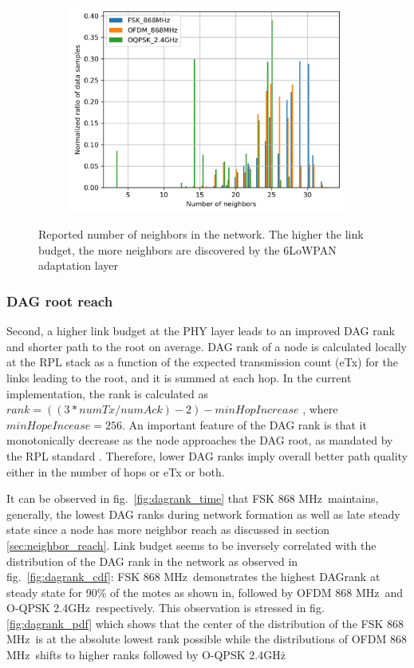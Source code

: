 \documentclass[journal]{IEEEtran}
\newcommand{\fsk}          {FSK 868 MHz}
\newcommand{\oqpsk}        {O-QPSK 2.4GHz}
\newcommand{\ofdm}         {OFDM 868 MHz}
\begin{document}
\begin{figure}[ht!]
    ~ 
	\begin{subfigure}{0.6\columnwidth}
		\centering
	\includegraphics[width=1\columnwidth]{numNeighbors_pdf_plot_full_steady_normalized}
	\label{fig:neighbors_pdf}
	\end{subfigure}%

	\caption{Reported number of neighbors in the network. The higher the link budget, the more neighbors are discovered by the 6LoWPAN adaptation layer} 
	\label{fig:neighbors_all}
\end{figure}

\subsubsection{DAG root reach}
Second, a higher link budget at the PHY layer leads to an improved DAG rank and shorter path to the root on average. 
DAG rank of a node is calculated locally at the RPL stack as a function of the expected transmission count (eTx) for the links leading to the root, and it is summed at each hop.
In the current implementation, the rank is calculated as $rank = ((3*numTx/numAck)-2)-minHopIncrease$
 , where $minHopeIncease = 256$. 
An important feature of the DAG rank is that it monotonically decrease as  the node approaches the DAG root, as mandated by the RPL standard \cite{t.wintered.12rpl}.
Therefore, lower DAG ranks imply overall better path quality either in the number of hops or eTx or both. 

It can be observed in fig.~\ref{fig:dagrank_time} that \fsk\ maintains, generally, the lowest DAG ranks during network formation as well as late steady state since a node has more neighbor reach as discussed in section \ref{sec:neighbor_reach}. 
 Link budget seems to be inversely correlated with the distribution of the DAG rank in the network as observed in fig.~\ref{fig:dagrank_cdf}: \fsk\ demonstrates the highest DAGrank at steady state for 90\% of the motes as shown in, followed by \ofdm\ and \oqpsk\ respectively.
This observation is stressed in fig.\ref{fig:dagrank_pdf} which shows that the center of the distribution of the \fsk\ is at the absolute lowest rank possible while the distributions of \ofdm\ shifts to higher ranks followed by \oqpsk\. 
\end{document}
